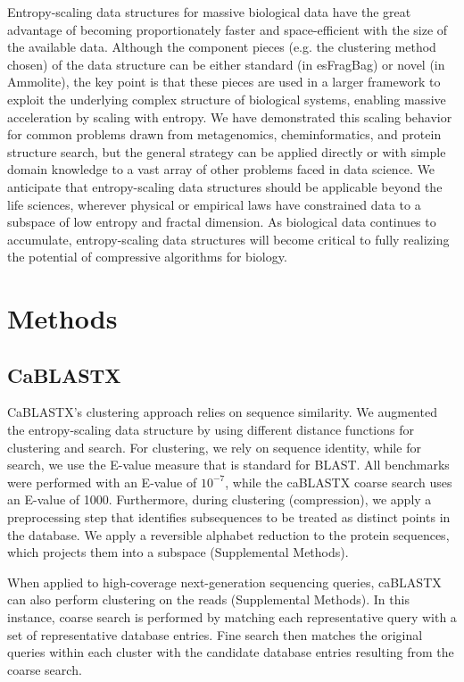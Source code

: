 \documentclass[review,preprint,12pt]{elsarticle}
\theoremstyle{definition}
\theoremstyle{remark}
\numberwithin{equation}{section}
\begin{document}
Entropy-scaling data structures for massive biological data have the great
advantage of becoming proportionately faster and space-efficient with the
size of the available data.
Although the component pieces (e.g. the clustering method chosen) of the data structure can be either standard (in esFragBag) or novel (in Ammolite), the key point is that these pieces are used in a larger framework to exploit the underlying complex structure of biological systems, enabling massive acceleration by scaling with entropy.
We have demonstrated this scaling behavior for common problems drawn from
metagenomics, cheminformatics, and protein structure search, but the general strategy can be applied
directly or with simple domain knowledge to a vast array of other problems
faced in data science.
We anticipate that entropy-scaling data structures should be applicable beyond
the life sciences, wherever physical or empirical laws have constrained data to 
a subspace of low entropy and fractal dimension.
As biological data continues to accumulate, entropy-scaling data structures
will become critical to fully realizing the potential of compressive
algorithms for biology. 

\section{Methods}
\subsection{CaBLASTX}
CaBLASTX's clustering approach relies on sequence similarity.
We augmented the entropy-scaling data structure by using
different distance functions for clustering and search.
For clustering, we rely on sequence identity, while for search, we use the
E-value measure that is standard for BLAST.
All benchmarks were performed with an E-value of $10^{-7}$, while the 
caBLASTX coarse search uses an E-value of 1000.
Furthermore, during clustering (compression), we apply a preprocessing step that
identifies subsequences to be treated as distinct points in the database.
We apply a reversible alphabet reduction to the
protein sequences, which projects them into a subspace (Supplemental Methods).

When applied to high-coverage next-generation sequencing queries, caBLASTX can also perform clustering on the reads (Supplemental Methods).
In this instance, coarse search is performed by matching each representative query with a set of representative database entries.
Fine search then matches the original queries within each cluster with the candidate database entries resulting from the coarse search.
\end{document}
